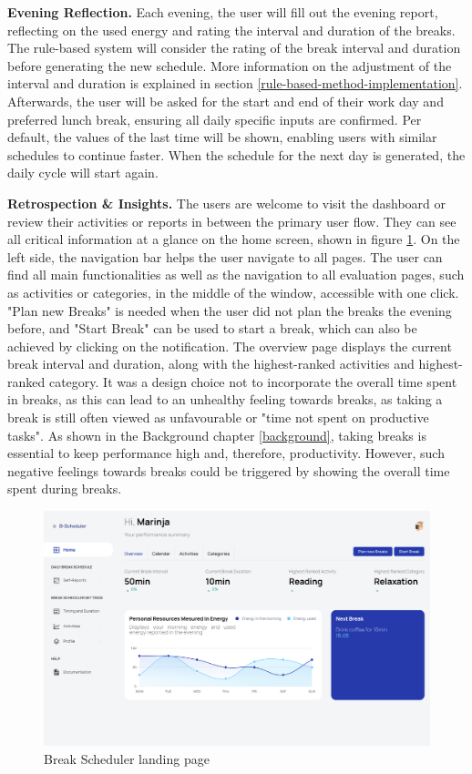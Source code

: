 \documentclass{hasel_thesis}
\begin{document}
\textbf{Evening Reflection.} Each evening, the user will fill out the evening report, reflecting on the used energy and rating the interval and duration of the breaks. The rule-based system will consider the rating of the break interval and duration before generating the new schedule. More information on the adjustment of the interval and duration is explained in section \ref{rule-based-method-implementation}. Afterwards, the user will be asked for the start and end of their work day and preferred lunch break, ensuring all daily specific inputs are confirmed. Per default, the values of the last time will be shown, enabling users with similar schedules to continue faster. When the schedule for the next day is generated, the daily cycle will start again.

\textbf{Retrospection \& Insights.} The users are welcome to visit the dashboard or review their activities or reports in between the primary user flow. They can see all critical information at a glance on the home screen, shown in figure \ref{fig:dashboard}. On the left side, the navigation bar helps the user navigate to all pages. The user can find all main functionalities as well as the navigation to all evaluation pages, such as activities or categories, in the middle of the window, accessible with one click. "Plan new Breaks" is needed when the user did not plan the breaks the evening before, and "Start Break" can be used to start a break, which can also be achieved by clicking on the notification. The overview page displays the current break interval and duration, along with the highest-ranked activities and highest-ranked category. It was a design choice not to incorporate the overall time spent in breaks, as this can lead to an unhealthy feeling towards breaks, as taking a break is still often viewed as unfavourable or "time not spent on productive tasks". As shown in the Background chapter \ref{background}, taking breaks is essential to keep performance high and, therefore, productivity. However, such negative feelings towards breaks could be triggered by showing the overall time spent during breaks.

\begin{figure}[htp]
    \centering
    \includegraphics[width=15cm]{hasel_thesis/images/dashboard.png}
    \caption{Break Scheduler landing page}
    \label{fig:dashboard}
\end{figure}
\end{document}
